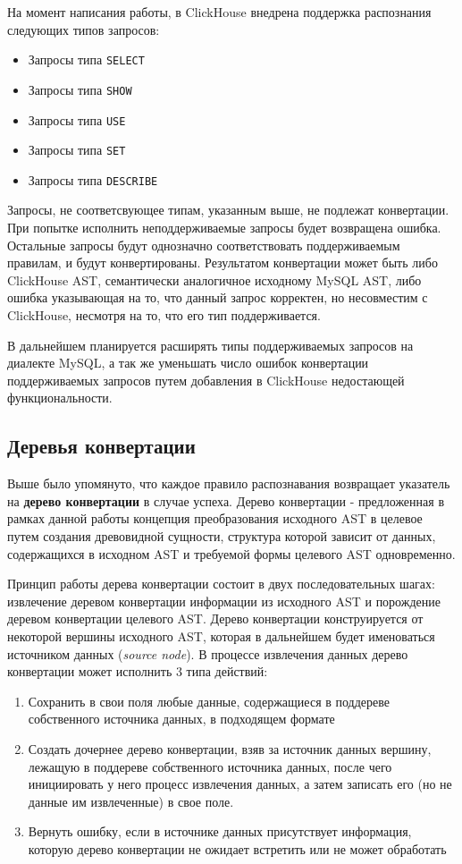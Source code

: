 На момент написания работы, в ClickHouse внедрена поддержка распознания следующих типов запросов:
\begin{itemize}
    \item Запросы типа \texttt{SELECT}
    \item Запросы типа \texttt{SHOW}
    \item Запросы типа \texttt{USE}
    \item Запросы типа \texttt{SET}
    \item Запросы типа \texttt{DESCRIBE}
\end{itemize}

Запросы, не соответсвующее типам, указанным выше, не подлежат конвертации. При попытке исполнить неподдерживаемые запросы будет возвращена ошибка. Остальные запросы будут однозначно соответствовать поддерживаемым правилам, и будут конвертированы. Результатом конвертации может быть либо ClickHouse AST, семантически аналогичное исходному MySQL AST, либо ошибка указывающая на то, что данный запрос корректен, но несовместим с ClickHouse, несмотря на то, что его тип поддерживается.

В дальнейшем планируется расширять типы поддерживаемых запросов на диалекте MySQL, а так же уменьшать число ошибок конвертации поддерживаемых запросов путем добавления в ClickHouse недостающей функциональности. 

\subsection{Деревья конвертации} \label{conv_tree}
Выше было упомянуто, что каждое правило распознавания возвращает указатель на \textbf{дерево конвертации} в случае успеха. Дерево конвертации - предложенная в рамках данной работы концепция преобразования исходного AST в целевое путем создания древовидной сущности, структура которой зависит от данных, содержащихся в исходном AST и требуемой формы целевого AST одновременно. 

Принцип работы дерева конвертации состоит в двух последовательных шагах: извлечение деревом конвертации информации из исходного AST и порождение деревом конвертации целевого AST. Дерево конвертации конструируется от некоторой вершины исходного AST, которая в дальнейшем будет именоваться источником данных (\textit{source node}). В процессе извлечения данных дерево конвертации может исполнить 3 типа действий:

\begin{enumerate}
    \item Сохранить в свои поля любые данные, содержащиеся в поддереве собственного источника данных, в подходящем формате
    \item Создать дочернее дерево конвертации, взяв за источник данных вершину, лежащую в поддереве собственного источника данных, после чего инициировать у него процесс извлечения данных, а затем записать его (но не данные им извлеченные) в свое поле. 
    \item Вернуть ошибку, если в источнике данных присутствует информация, которую дерево конвертации не ожидает встретить или не может обработать
\end{enumerate}

